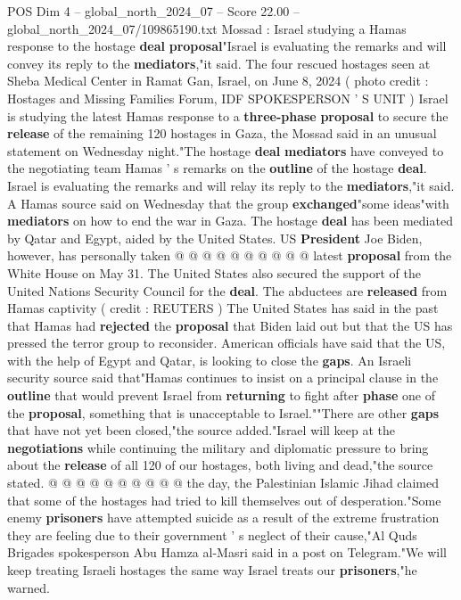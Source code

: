 \begin{textsample}{POS Dim 4 – global\_north\_2024\_07 – Score 22.00 – global\_north\_2024\_07/109865190.txt}  \label{ex:f4_pos_178}
Mossad : Israel studying a Hamas response to the hostage \textbf{deal} \textbf{proposal}"Israel is evaluating the remarks and will convey its reply to the \textbf{mediators},"it said.
The four rescued hostages seen at Sheba Medical Center in Ramat Gan, Israel, on June 8, 2024 ( photo credit : Hostages and Missing Families Forum, IDF SPOKESPERSON ' S UNIT ) Israel is studying the latest Hamas response to a \textbf{three-phase} \textbf{proposal} to secure the \textbf{release} of the remaining 120 hostages in Gaza, the Mossad said in an unusual statement on Wednesday night."The hostage \textbf{deal} \textbf{mediators} have conveyed to the negotiating team Hamas ' s remarks on the \textbf{outline} of the hostage \textbf{deal}.
Israel is evaluating the remarks and will relay its reply to the \textbf{mediators},"it said.
A Hamas source said on Wednesday that the group \textbf{exchanged}"some ideas"with \textbf{mediators} on how to end the war in Gaza.
The hostage \textbf{deal} has been mediated by Qatar and Egypt, aided by the United States.
US \textbf{President} Joe Biden, however, has personally taken @ @ @ @ @ @ @ @ @ @ latest \textbf{proposal} from the White House on May 31.
The United States also secured the support of the United Nations Security Council for the \textbf{deal}.
The abductees are \textbf{released} from Hamas captivity ( credit : REUTERS ) The United States has said in the past that Hamas had \textbf{rejected} the \textbf{proposal} that Biden laid out but that the US has pressed the terror group to reconsider.
American officials have said that the US, with the help of Egypt and Qatar, is looking to close the \textbf{gaps}.
An Israeli security source said that"Hamas continues to insist on a principal clause in the \textbf{outline} that would prevent Israel from \textbf{returning} to fight after \textbf{phase} one of the \textbf{proposal}, something that is unacceptable to Israel.""There are other \textbf{gaps} that have not yet been closed,"the source added."Israel will keep at the \textbf{negotiations} while continuing the military and diplomatic pressure to bring about the \textbf{release} of all 120 of our hostages, both living and dead,"the source stated. @ @ @ @ @ @ @ @ @ @ the day, the Palestinian Islamic Jihad claimed that some of the hostages had tried to kill themselves out of desperation."Some enemy \textbf{prisoners} have attempted suicide as a result of the extreme frustration they are feeling due to their government ' s neglect of their cause,"Al Quds Brigades spokesperson Abu Hamza al-Masri said in a post on Telegram."We will keep treating Israeli hostages the same way Israel treats our \textbf{prisoners},"he warned.

\end{textsample}
